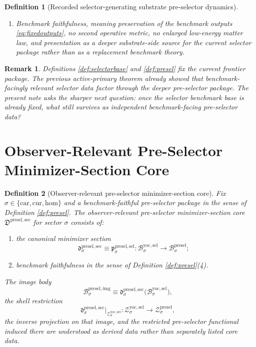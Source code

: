 \documentclass[11pt]{article}
\newcommand{\Car}{\mathrm{car}}
\newcommand{\Cur}{\mathrm{cur}}
\newcommand{\Hom}{\mathrm{hom}}
\newcommand{\YoctoSelectorBody}[1]{\mathcal B_{#1}^{\mathrm{yoc,sel}}}
\newcommand{\YoctoSelectorShell}[1]{\mathcal Z_{#1}^{\mathrm{yoc,sel}}}
\newcommand{\PreSelectorBody}[1]{\mathcal B_{#1}^{\mathrm{presel}}}
\newcommand{\PreSelectorProj}[1]{\Pi_{#1}^{\mathrm{presel}}}
\newcommand{\PreSelectorFiber}[2]{\mathcal F_{#1}^{\mathrm{presel}}(#2)}
\newcommand{\PreSelectorFunctional}[1]{\mathscr P_{#1}^{\mathrm{presel}}}
\newcommand{\PreSelectorSelectorMin}[1]{\mathfrak p_{#1}^{\mathrm{presel,sel}}}
\newcommand{\PreSelectorShell}[1]{\mathcal Z_{#1}^{\mathrm{presel}}}
\newcommand{\PreSelectorMinSectionCore}{\mathfrak D^{\mathrm{presel,sec}}}
\newcommand{\PreSelectorMinSection}[1]{\mathfrak d_{#1}^{\mathrm{presel,sec}}}
\newcommand{\PreSelectorImgBody}[1]{\mathcal B_{#1}^{\mathrm{presel,img}}}
\newtheorem{definition}{Definition}
\newtheorem{remark}{Remark}
\begin{document}
\begin{definition}[Recorded selector-generating substrate pre-selector dynamics]
\begin{enumerate}
\[\begin{array}{l}
    \PreSelectorFunctional{\sigma}(u)
    =
    \displaystyle\min_{v\in\PreSelectorFiber{\sigma}{\PreSelectorProj{\sigma}(u)}}
    \PreSelectorFunctional{\sigma}(v)
    \end{array}
    \right\},
    \]
    and
    \[
    \PreSelectorProj{\sigma}\big|_{\PreSelectorShell{\sigma}}
    :
    \PreSelectorShell{\sigma}\xrightarrow{\cong}\YoctoSelectorShell{\sigma}
    \]
    is a diffeomorphism.
    \item Benchmark faithfulness, meaning preservation of the benchmark outputs \eqref{eq:fixedoutputs}, no second operative metric, no enlarged low-energy matter law, and presentation as a deeper substrate-side source for the current selector package rather than as a replacement benchmark theory.
\end{enumerate}
\end{definition}

\begin{remark}
Definitions \ref{def:selectorbase} and \ref{def:presel} fix the current frontier package. The previous active-primary theorem already showed that benchmark-facingly relevant selector data factor through the deeper pre-selector package. The present note asks the sharper next question: once the selector benchmark base is already fixed, what still survives as independent benchmark-facing pre-selector data?
\end{remark}

\section{Observer-Relevant Pre-Selector Minimizer-Section Core}

\begin{definition}[Observer-relevant pre-selector minimizer-section core]
\label{def:sectioncore}
Fix \(\sigma\in\{\Car,\Cur,\Hom\}\) and a benchmark-faithful pre-selector package in the sense of Definition \ref{def:presel}. The \emph{observer-relevant pre-selector minimizer-section core} \(\PreSelectorMinSectionCore\) for sector \(\sigma\) consists of:
\begin{enumerate}
    \item the canonical minimizer section
    \[
    \PreSelectorMinSection{\sigma}
    \equiv
    \PreSelectorSelectorMin{\sigma}
    :
    \YoctoSelectorBody{\sigma}\to\PreSelectorBody{\sigma};
    \]
    \item benchmark faithfulness in the sense of Definition \ref{def:presel}(4).
\end{enumerate}
The image body
\[
\PreSelectorImgBody{\sigma}
\equiv
\PreSelectorMinSection{\sigma}\bigl(\YoctoSelectorBody{\sigma}\bigr),
\]
the shell restriction
\[
\PreSelectorMinSection{\sigma}\big|_{\YoctoSelectorShell{\sigma}}
:
\YoctoSelectorShell{\sigma}\to\PreSelectorShell{\sigma},
\]
the inverse projection on that image, and the restricted pre-selector functional induced there are understood as derived data rather than separately listed core data.
\end{definition}
\end{document}

